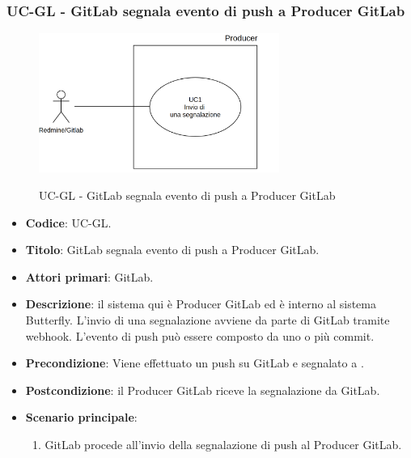 	\subsubsection{UC\theuccount-GL - GitLab segnala evento di push a Producer GitLab}
	\begin{figure}[H]
		\centering
		\includegraphics[width=0.7\textwidth]{img/UC1.png}\\
		\caption{UC\theuccount-GL - GitLab segnala evento di push a Producer GitLab}
	\end{figure}
	\begin{itemize}
		\item \textbf{Codice}: UC\theuccount-GL.
		\item \textbf{Titolo}: GitLab segnala evento di push a Producer GitLab.
		\item \textbf{Attori primari}: GitLab.
		\item \textbf{Descrizione}: il sistema qui è Producer GitLab ed è interno al sistema Butterfly. L'invio di
		una segnalazione avviene da parte di GitLab tramite webhook. L'evento di
		push può essere composto da uno o più commit.
		\item \textbf{Precondizione}: Viene effettuato un push su GitLab e segnalato a \progetto.
		\item \textbf{Postcondizione}: il Producer GitLab riceve la segnalazione da GitLab.
		\item \textbf{Scenario principale}: 
		\begin{enumerate}
			\item GitLab procede all'invio della segnalazione di push al Producer GitLab.
		\end{enumerate}
		
	\end{itemize}